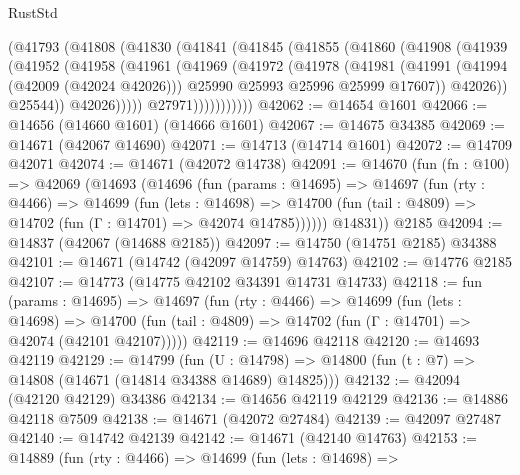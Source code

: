 \begin{lexlean}{RustStd}
\begin{coremodule}
              (@41793
                (@41808
                  (@41830
                    (@41841
                      (@41845
                        (@41855
                          (@41860
                            (@41908
                              (@41939
                                (@41952
                                  (@41958
                                    (@41961
                                      (@41969
                                        (@41972
                                          (@41978
                                            (@41981
                                              (@41991
                                                (@41994 (@42009 (@42024 @42026)))
                                                @25990
                                                @25993
                                                @25996
                                                @25999
                                                @17607))
                                            @42026))
                                        @25544))
                                    @42026)))))
                          @27971)))))))))))
@42062 := @14654 @1601
@42066 := @14656 (@14660 @1601) (@14666 @1601)
@42067 := @14675 @34385
@42069 := @14671 (@42067 @14690)
@42071 := @14713 (@14714 @1601)
@42072 := @14709 @42071
@42074 := @14671 (@42072 @14738)
@42091 := @14670
    (fun (fn : @100) =>
    @42069
      (@14693
        (@14696
          (fun (params : @14695) =>
          @14697
            (fun (rty : @4466) =>
            @14699
              (fun (lets : @14698) =>
              @14700 (fun (tail : @4809) => @14702 (fun (Γ : @14701) => @42074 @14785))))))
        @14831))
    @2185
@42094 := @14837 (@42067 (@14688 @2185))
@42097 := @14750 (@14751 @2185) @34388
@42101 := @14671 (@14742 (@42097 @14759) @14763)
@42102 := @14776 @2185
@42107 := @14773 (@14775 @42102 @34391 @14731 @14733)
@42118 := fun (params : @14695) =>
  @14697
    (fun (rty : @4466) =>
    @14699
      (fun (lets : @14698) =>
      @14700 (fun (tail : @4809) => @14702 (fun (Γ : @14701) => @42074 (@42101 @42107)))))
@42119 := @14696 @42118
@42120 := @14693 @42119
@42129 := @14799
    (fun (U : @14798) => @14800 (fun (t : @7) => @14808 (@14671 (@14814 @34388 @14689) @14825)))
@42132 := @42094 (@42120 @42129) @34386
@42134 := @14656 @42119 @42129
@42136 := @14886 @42118 @7509
@42138 := @14671 (@42072 @27484)
@42139 := @42097 @27487
@42140 := @14742 @42139
@42142 := @14671 (@42140 @14763)
@42153 := @14889
    (fun (rty : @4466) =>
    @14699
      (fun (lets : @14698) =>

\end{coremodule}
\end{lexlean}
